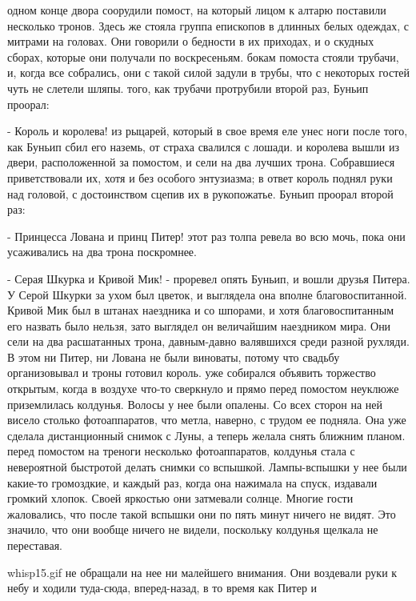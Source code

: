  одном конце двора соорудили помост, на который лицом к алтарю 
поставили несколько тронов. Здесь же стояла группа епископов в длинных 
белых одеждах, с митрами на головах. Они говорили о бедности в их 
приходах, и о скудных сборах, которые они получали по воскресеньям.
 бокам помоста стояли трубачи, и, когда все собрались, они с 
такой силой задули в трубы, что с некоторых гостей чуть не слетели 
шляпы.
 того, как трубачи протрубили второй раз, Буньип проорал:
\par- Король и королева!
 из рыцарей, который в свое время еле унес ноги после того, 
как Буньип сбил его наземь, от страха свалился с лошади.
 и королева вышли из двери, расположенной за помостом, и 
сели на два лучших трона. Собравшиеся приветствовали их, хотя и без 
особого энтузиазма; в ответ король поднял руки над головой, с 
достоинством сцепив их в рукопожатье.
 Буньип проорал второй раз:
\par- Принцесса Лована и принц Питер!
 этот раз толпа ревела во всю мочь, пока они усаживались на два 
трона поскромнее.
\par- Серая Шкурка и Кривой Мик! - проревел опять Буньип, и вошли 
друзья Питера. У Серой Шкурки за ухом был цветок, и выглядела она 
вполне благовоспитанной. Кривой Мик был в штанах наездника и со 
шпорами, и хотя благовоспитанным его назвать было нельзя, зато 
выглядел он величайшим наездником мира. Они сели на два расшатанных 
трона, давным-давно валявшихся среди разной рухляди. В этом ни Питер, 
ни Лована не были виноваты, потому что свадьбу организовывал и троны 
готовил король.
 уже собирался объявить торжество открытым, когда в воздухе 
что-то сверкнуло и прямо перед помостом неуклюже приземлилась 
колдунья. Волосы у нее были опалены. Со всех сторон на ней висело 
столько фотоаппаратов, что метла, наверно, с трудом ее подняла. Она 
уже сделала дистанционный снимок с Луны, а теперь желала снять ближним 
планом.
 перед помостом на треноги несколько фотоаппаратов, 
колдунья стала с невероятной быстротой делать снимки со вспышкой. 
Лампы-вспышки у нее были какие-то громоздкие, и каждый раз, когда она 
нажимала на спуск, издавали громкий хлопок. Своей яркостью они 
затмевали солнце. Многие гости жаловались, что после такой вспышки они 
по пять минут ничего не видят. Это значило, что они вообще ничего не 
видели, поскольку колдунья щелкала не переставая.
\par{whisp15.gif}
 не обращали на нее ни малейшего внимания. Они воздевали 
руки к небу и ходили туда-сюда, вперед-назад, в то время как Питер и 

